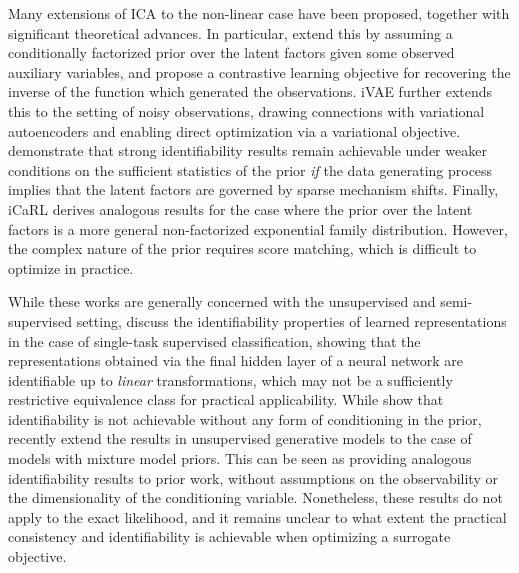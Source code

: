 \documentclass{article} %
\theoremstyle{plain}
\theoremstyle{definition}
\theoremstyle{remark}
\begin{document}
\vspace{-0.4ex}
Many extensions of ICA to the non-linear case have been proposed, together with significant theoretical advances. In particular, \citet{hyvarinen2019nonlinear} extend this by assuming a conditionally factorized prior over the latent factors given some observed auxiliary variables, and propose a contrastive learning objective for recovering the inverse of the function which generated the observations.
iVAE \citep{Khemakhem_Kingma_Monti_Hyvarinen_2020} further extends this to the setting of noisy observations, drawing connections with variational autoencoders \citep{kingma2013auto} and enabling direct optimization via a variational objective. \citet{Lachapelle_López_Sharma_Everett_Priol_Lacoste_Lacoste-Julien_2022} demonstrate that strong identifiability results remain achievable under weaker conditions on the sufficient statistics of the prior \textit{if} the data generating process implies that the latent factors are governed by sparse mechanism shifts.
Finally, iCaRL \citep{Lu_Wu_Hernandez-Lobato_Scholkopf_2022} derives analogous results for the case where the prior over the latent factors is a more general non-factorized exponential family distribution. However, the complex nature of the prior requires score matching, which is difficult to optimize in practice.

\vspace{-0.4ex}
While these works are generally concerned with the unsupervised and semi-supervised setting, \citet{khemakhem2020ice,Roeder_Metz_Kingma_2021} discuss the identifiability properties of learned representations in the case of single-task supervised classification, showing 
that the representations obtained via the final hidden layer of a neural network are identifiable up to \textit{linear} transformations, which may not be a sufficiently restrictive equivalence class for practical applicability. 
While \citet{Hyvärinen_Pajunen_1999, Khemakhem_Kingma_Monti_Hyvarinen_2020} show that identifiability is not achievable without any form of conditioning in the prior, \citet{halva2020hidden,halva2021disentangling,Willetts_Paige_2022,Kivva_Rajendran_Ravikumar_Aragam_2022} recently extend the results in unsupervised generative models to the case of models with mixture model priors. This can be seen as providing analogous identifiability results to prior work, without assumptions on the observability or the dimensionality of the conditioning variable. Nonetheless, these results do not apply to the exact likelihood, and it remains unclear to what extent the practical consistency and identifiability is achievable when optimizing a surrogate objective.
\end{document}
